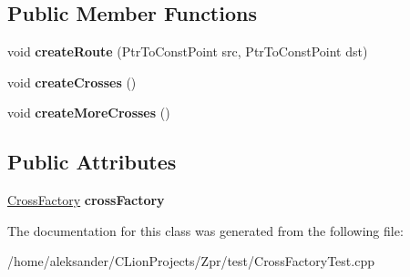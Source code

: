 \subsection*{Public Member Functions}
\begin{DoxyCompactItemize}
\item 
\hypertarget{classCrossFactoryTest_a9c2960a7cdf153afc8fbec7e759fdaa5}{void {\bfseries create\-Route} (Ptr\-To\-Const\-Point src, Ptr\-To\-Const\-Point dst)}\label{classCrossFactoryTest_a9c2960a7cdf153afc8fbec7e759fdaa5}

\item 
\hypertarget{classCrossFactoryTest_af82d127713574f5f962f3774206dddf0}{void {\bfseries create\-Crosses} ()}\label{classCrossFactoryTest_af82d127713574f5f962f3774206dddf0}

\item 
\hypertarget{classCrossFactoryTest_af3f6b63f273493a5c354243ff713fe74}{void {\bfseries create\-More\-Crosses} ()}\label{classCrossFactoryTest_af3f6b63f273493a5c354243ff713fe74}

\end{DoxyCompactItemize}
\subsection*{Public Attributes}
\begin{DoxyCompactItemize}
\item 
\hypertarget{classCrossFactoryTest_a4f8d430683d98c9ef9b190346c136935}{\hyperlink{classCrossFactory}{Cross\-Factory} {\bfseries cross\-Factory}}\label{classCrossFactoryTest_a4f8d430683d98c9ef9b190346c136935}

\end{DoxyCompactItemize}


The documentation for this class was generated from the following file\-:\begin{DoxyCompactItemize}
\item 
/home/aleksander/\-C\-Lion\-Projects/\-Zpr/test/Cross\-Factory\-Test.\-cpp\end{DoxyCompactItemize}
